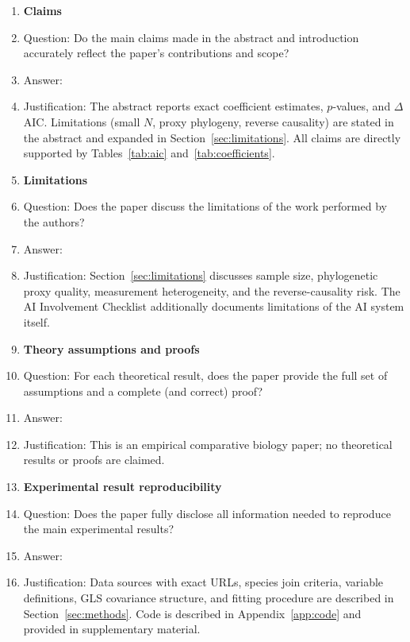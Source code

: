 \documentclass{article}
\begin{document}
\begin{enumerate}

\item {\bf Claims}
    \item[] Question: Do the main claims made in the abstract and introduction accurately reflect the paper's contributions and scope?
    \item[] Answer: \answerYes{}
    \item[] Justification: The abstract reports exact coefficient estimates, $p$-values, and $\Delta$AIC. Limitations (small $N$, proxy phylogeny, reverse causality) are stated in the abstract and expanded in Section~\ref{sec:limitations}. All claims are directly supported by Tables~\ref{tab:aic} and~\ref{tab:coefficients}.

\item {\bf Limitations}
    \item[] Question: Does the paper discuss the limitations of the work performed by the authors?
    \item[] Answer: \answerYes{}
    \item[] Justification: Section~\ref{sec:limitations} discusses sample size, phylogenetic proxy quality, measurement heterogeneity, and the reverse-causality risk. The AI Involvement Checklist additionally documents limitations of the AI system itself.

\item {\bf Theory assumptions and proofs}
    \item[] Question: For each theoretical result, does the paper provide the full set of assumptions and a complete (and correct) proof?
    \item[] Answer: \answerNA{}
    \item[] Justification: This is an empirical comparative biology paper; no theoretical results or proofs are claimed.

\item {\bf Experimental result reproducibility}
    \item[] Question: Does the paper fully disclose all information needed to reproduce the main experimental results?
    \item[] Answer: \answerYes{}
    \item[] Justification: Data sources with exact URLs, species join criteria, variable definitions, GLS covariance structure, and fitting procedure are described in Section~\ref{sec:methods}. Code is described in Appendix~\ref{app:code} and provided in supplementary material.


\end{enumerate}
\end{document}
